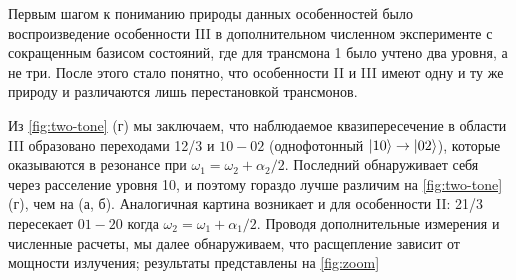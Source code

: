 \documentclass[14pt, a4paper]{extreport}
\DeclarePairedDelimiter\ket{\lvert}{\rangle}
\numberwithin{equation}{section}
\begin{document}
Первым шагом к пониманию природы данных особенностей было воспроизведение особенности III в дополнительном численном эксперименте с сокращенным базисом состояний, где для трансмона 1 было учтено два уровня, а не три. После этого стало понятно, что особенности II и III имеют одну и ту же природу и различаются лишь перестановкой трансмонов.

Из \autoref{fig:two-tone} (г) мы заключаем, что наблюдаемое квазипересечение в области III образовано переходами 12/3 и $ 10-02 $ (однофотонный $\ket{10}\rightarrow\ket{02}$), которые оказываются в резонансе при $\omega_1 = \omega_2 + \alpha_2/2$. Последний обнаруживает себя через расселение уровня 10, и поэтому гораздо лучше различим на \autoref{fig:two-tone} (г), чем на (а, б). Аналогичная картина возникает и для особенности II: 21/3 пересекает $ 01-20 $ когда $\omega_2 = \omega_1 + \alpha_1/2$. Проводя дополнительные измерения и численные расчеты, мы далее обнаруживаем, что расщепление зависит от мощности излучения; результаты представлены на \autoref{fig:zoom}
\end{document}
